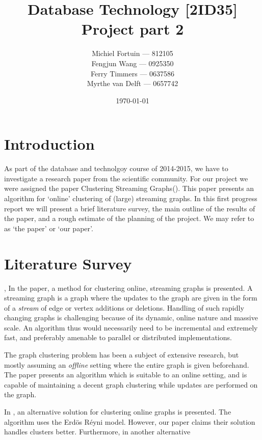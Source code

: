 \documentclass[a4paper,11pt]{article}
\title{Database Technology [2ID35] \\
\textbf{Project part 2}}
\author{
Michiel Fortuin --- 812105 \\
Fengjun Wang --- 0925350 \\
Ferry Timmers --- 0637586 \\
Myrthe van Delft --- 0657742}
\date{\today}
\begin{document}
\newcommand{\papername}[0]{Clustering Streaming Graphs}

\maketitle

\section{Introduction}
As part of the database and technolgoy course of 2014-2015, we have to investigate a research paper from the scientific community. For our project we were assigned the paper \papername (\cite{paper}). This paper presents an algorithm for `online' clustering of (large) streaming graphs. In this first progress report we will present a brief literature survey, the main outline of the results of the paper, and a rough estimate of the planning of the project. We may refer to \cite{paper} as `the paper' or `our paper'.

\section{Literature Survey}, 
In the paper, a method for clustering online, streaming graphs is presented. A streaming graph is a graph where the updates to the graph are given in the form of a \textit{stream} of edge or vertex additions or deletions. Handling of such rapidly changing graphs is challenging because of its dynamic, online nature and massive scale. An algorithm thus would necessarily need to be incremental and extremely fast, and preferably amenable to parallel or distributed implementations. 

The graph clustering problem has been a subject of extensive research, but mostly assuming an \textit{offline} setting where the entire graph is given beforehand. The paper presents an algorithm which is suitable to an online setting, and is capable of maintaining a decent graph clustering while updates are performed on the graph. 

In \cite{11}, an alternative solution for clustering online graphs is presented. The algorithm uses the Erdös Réyni model. However, our paper claims their solution handles clusters better. Furthermore, in \cite{13} another alternative 

\end{document}
